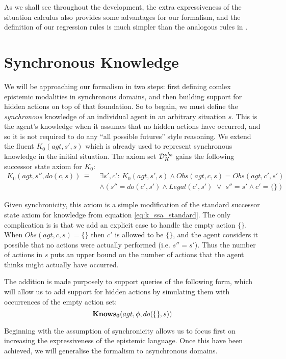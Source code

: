 As we shall see throughout the development, the extra expressiveness
of the situation calculus also provides some advantages for our formalism,
and the definition of our regression rules is much simpler than the
analogous rules in \citep{vanBenthem06lcc}.


\section{Synchronous Knowledge\label{sec:CKnowledge:Synchronous}}

We will be approaching our formalism in two steps: first defining
comlex epistemic modalities in synchronous domains, and then building
support for hidden actions on top of that foundation. So to begain,
we must define the \emph{synchronous} knowledge of an individual agent
in an arbitrary situation $s$. This is the agent's knowledge when
it assumes that no hidden actions have occurred, and so it is not
required to do any {}``all possible futures'' style reasoning. We
extend the fluent $K_{0}(agt,s',s)$ which is already used to represent
synchronous knowledge in the initial situation. The axiom set $\mathcal{D}_{K}^{obs}$
gains the following successor state axiom for $K_{0}$:\begin{align}
K_{0}(agt,s'',do(c,s))\,\equiv\,\, & \exists s',c':\, K_{0}(agt,s',s)\wedge Obs(agt,c,s)=Obs(agt,c',s')\nonumber \\
 & \wedge\left(s''=do(c',s')\wedge Legal(c',s')\,\,\vee\,\, s''=s'\wedge c'=\{\}\right)\label{eq:K0_ssa}\end{align}


Given synchronicity, this axiom is a simple modification of the standard
successor state axiom for knowledge from equation \eqref{eq:k_ssa_standard}.
The only complication is is that we add an explicit case to handle
the empty action $\{\}$. When \textbf{$Obs(agt,c,s)=\{\}$} then
$c'$ is allowed to be $\{\}$, and the agent considers it possible
that no actions were actually performed (i.e. $s''=s'$). Thus the
number of actions in $s$ puts an upper bound on the number of actions
that the agent thinks might actually have occurred.

The addition is made purposely to support queries of the following
form, which will allow us to add support for hidden actions by simulating
them with occurrences of the empty action set:\[
\mathbf{Knows_{0}}(agt,\phi,do(\{\},s))\]


Beginning with the assumption of synchronicity allows us to focus
first on increasing the expressiveness of the epistemic language.
Once this have been achieved, we will generalise the formalism to
asynchronous domains.


